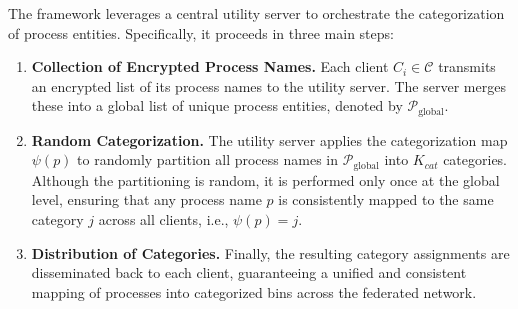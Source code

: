 The framework leverages a central utility server to orchestrate the categorization of process entities. Specifically, it proceeds in three main steps:
\begin{enumerate}[itemsep=0.1em, parsep=0em, topsep=0em, leftmargin=*]
    \item \textbf{Collection of Encrypted Process Names.} Each client \(C_i \in \mathcal{C}\) transmits an encrypted list of its process names to the utility server. The server merges these into a global list of unique process entities, denoted by \( \mathcal{P}_{\text{global}} \).

    \item \textbf{Random Categorization.} The utility server applies the categorization map \( \psi(p) \) to randomly partition all process names in \( \mathcal{P}_{\text{global}} \) into \( K_{cat} \) categories. Although the partitioning is random, it is performed only once at the global level, ensuring that any process name \( p \) is consistently mapped to the same category \( j \) across all clients, i.e., \( \psi(p) = j \).

    \item \textbf{Distribution of Categories.} Finally, the resulting category assignments are disseminated back to each client, guaranteeing a unified and consistent mapping of processes into categorized bins across the federated network.
\end{enumerate}


